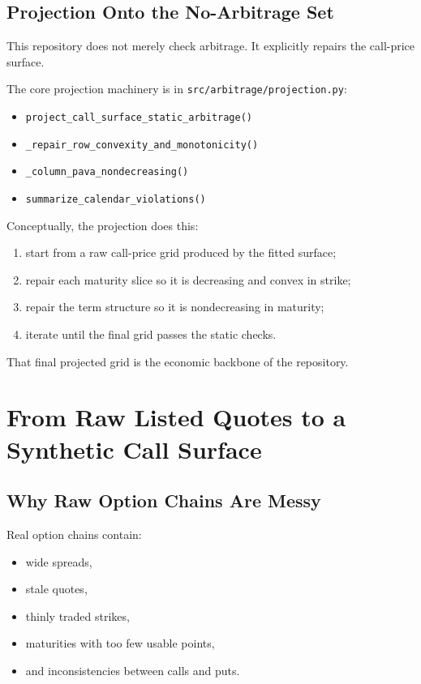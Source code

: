\documentclass[11pt]{article}
\begin{document}
\subsection{Projection Onto the No-Arbitrage Set}

This repository does not merely check arbitrage. It explicitly repairs the call-price surface.

The core projection machinery is in \texttt{src/arbitrage/projection.py}:

\begin{itemize}
  \item \texttt{project\_call\_surface\_static\_arbitrage()}
  \item \texttt{\_repair\_row\_convexity\_and\_monotonicity()}
  \item \texttt{\_column\_pava\_nondecreasing()}
  \item \texttt{summarize\_calendar\_violations()}
\end{itemize}

Conceptually, the projection does this:

\begin{enumerate}
  \item start from a raw call-price grid produced by the fitted surface;
  \item repair each maturity slice so it is decreasing and convex in strike;
  \item repair the term structure so it is nondecreasing in maturity;
  \item iterate until the final grid passes the static checks.
\end{enumerate}

That final projected grid is the economic backbone of the repository.

\section{From Raw Listed Quotes to a Synthetic Call Surface}

\subsection{Why Raw Option Chains Are Messy}

Real option chains contain:

\begin{itemize}
  \item wide spreads,
  \item stale quotes,
  \item thinly traded strikes,
  \item maturities with too few usable points,
  \item and inconsistencies between calls and puts.
\end{itemize}
\end{document}
